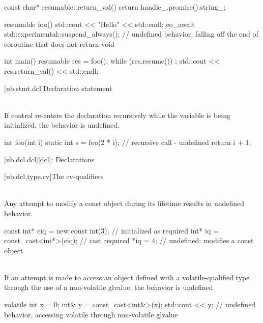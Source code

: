 {\begin{example}
\begin{codeblock}
const char* resumable::return_val() {
  return handle_.promise().string_;
}

resumable foo() {
  std::cout << "Hello" << std::endl;
  co_await std::experimental::suspend_always();
  // undefined behavior, falling off the end of coroutine that does not return void
}

int main() {
  resumable res = foo();
  while (res.resume())
    ;
  std::cout << res.return_val() << std::endl;
}
\end{codeblock}
\end{example}

[ub.stmt.dcl]{Declaration statement}

\pnum
{} \\
If control re-enters the declaration recursively while the
variable is being initialized, the behavior is undefined.

\pnum
\begin{example}
\begin{codeblock}
int foo(int i) {
  static int s = foo(2 * i);    // recursive call - undefined
  return i + 1;
}
\end{codeblock}
\end{example}




[ub.dcl.dcl]{\ref{dcl}: Declarations}

[ub.dcl.type.cv]{The cv-qualifiers}

\pnum
{} \\
Any attempt to modify a const object during its lifetime results in
undefined behavior.

\pnum
\begin{example}
\begin{codeblock}
const int* ciq = new const int(3);  // initialized as required
int* iq = const_cast<int*>(ciq);    // cast required
*iq = 4;                            // undefined: modifies a const object
\end{codeblock}
\end{example}


\pnum
{} \\
If an attempt is made to
access an object defined with a volatile-qualified type through the use of a non-volatile glvalue, the behavior
is undefined

\pnum
\begin{example}
\begin{codeblock}
volatile int x = 0;
int& y = const_cast<int&>(x);
std::cout << y;         // undefined behavior, accessing volatile through non-volatile glvalue
\end{codeblock}
\end{example}

}

